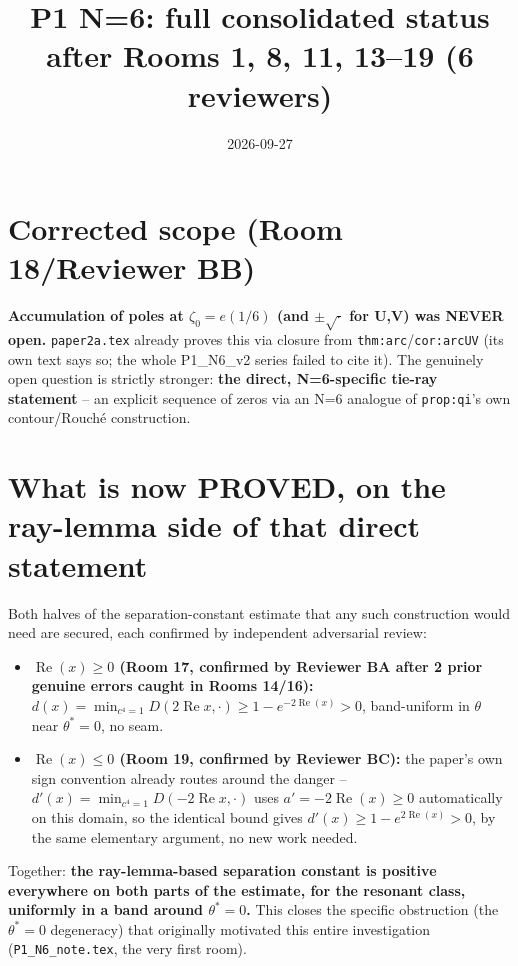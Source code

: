 \documentclass[11pt]{article}
\title{P1 N=6: full consolidated status after Rooms 1, 8, 11, 13--19 (6 reviewers)}
\date{2026-09-27}
\begin{document}
\maketitle

\section*{Corrected scope (Room 18/Reviewer BB)}
\textbf{Accumulation of poles at $\zeta_0=e(1/6)$ (and $\pm\sqrt{\cdot}$ for U,V) was NEVER open.}
\texttt{paper2a.tex} already proves this via closure from \texttt{thm:arc}/\texttt{cor:arcUV}
(its own text says so; the whole P1\_N6\_v2 series failed to cite it). The genuinely open question
is strictly stronger: \textbf{the direct, N=6-specific tie-ray statement} -- an explicit sequence
of zeros via an N=6 analogue of \texttt{prop:qi}'s own contour/Rouch\'e construction.

\section*{What is now PROVED, on the ray-lemma side of that direct statement}
Both halves of the separation-constant estimate that any such construction would need are secured,
each confirmed by independent adversarial review:
\begin{itemize}
\item \textbf{$\operatorname{Re}(x)\ge0$ (Room 17, confirmed by Reviewer BA after 2 prior genuine
errors caught in Rooms 14/16):} $d(x)=\min_{c^4=1}D(2\operatorname{Re}x,\cdot)\ge1-e^{-2\operatorname{Re}(x)}>0$,
band-uniform in $\theta$ near $\theta^\ast=0$, no seam.
\item \textbf{$\operatorname{Re}(x)\le0$ (Room 19, confirmed by Reviewer BC):} the paper's own
sign convention already routes around the danger -- $d'(x)=\min_{c^4=1}D(-2\operatorname{Re}x,\cdot)$
uses $a'=-2\operatorname{Re}(x)\ge0$ automatically on this domain, so the identical bound gives
$d'(x)\ge1-e^{2\operatorname{Re}(x)}>0$, by the same elementary argument, no new work needed.
\end{itemize}
Together: \textbf{the ray-lemma-based separation constant is positive everywhere on both parts of
the estimate, for the resonant class, uniformly in a band around $\theta^\ast=0$.} This closes the
specific obstruction (the $\theta^\ast=0$ degeneracy) that originally motivated this entire
investigation (\texttt{P1\_N6\_note.tex}, the very first room).
\end{document}
